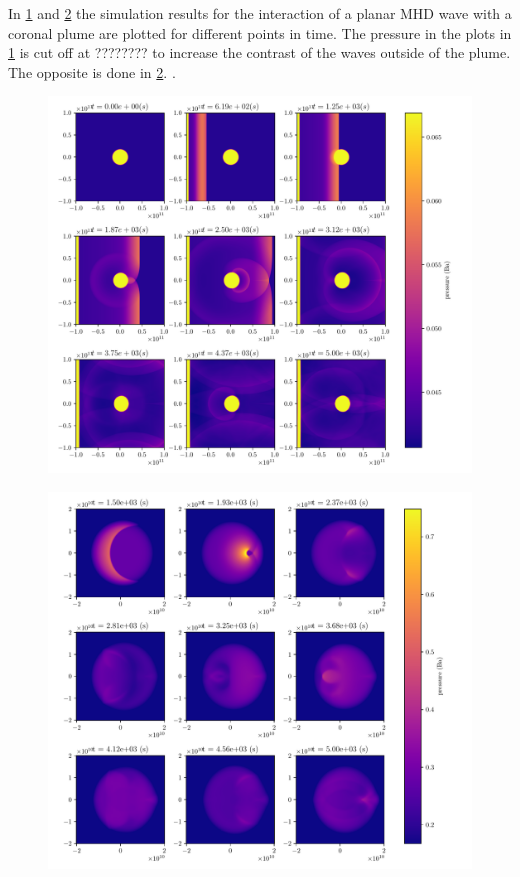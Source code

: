 \documentclass[a4paper]{article}
\numberwithin{figure}{section}
\numberwithin{equation}{section}
\begin{document}
In \cref{fig:figures-plume_time-pdf} and \cref{fig:figures-plume_reflection-pdf} the simulation results for the interaction of a planar MHD wave with a coronal plume are plotted for different points in time. The pressure in the plots in  \cref{fig:figures-plume_time-pdf} is cut off at ???????? to increase the contrast of the waves outside of the plume. The opposite is done in \cref{fig:figures-plume_reflection-pdf}. .\\
\begin{figure}[ht]
	\centering
	\includegraphics[width=1\textwidth]{figures/plume_time.pdf}
	\caption{}
	\label{fig:figures-plume_time-pdf}
\end{figure}
\begin{figure}[ht]
    \centering
    \includegraphics[width=1\textwidth]{figures/plume_reflection.pdf}
    \caption{}
    \label{fig:figures-plume_reflection-pdf}
\end{figure}
\end{document}
